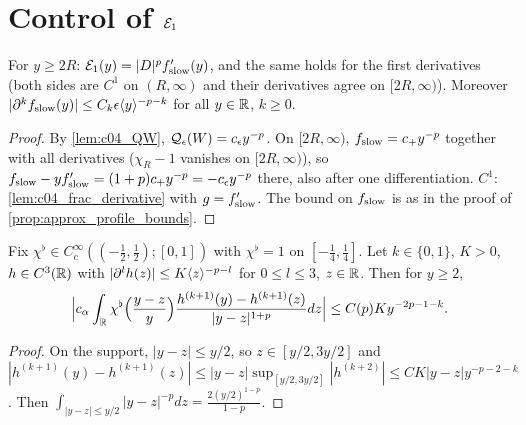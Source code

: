 \section{Control of $\mathcal{E}_1$}

\begin{lemma}
  \label{lem:c04_E1_formula}
  For $y\ge2R$: $\mathcal{E}_1(y)=|D|^pf_{\textup{slow}}'(y)$, and the same holds for the first derivatives (both sides are $C^1$ on $(R,\infty)$ and
  their derivatives agree on $[2R,\infty)$). Moreover $|\partial^kf_{\textup{slow}}(y)|\le C_k\epsilon\langle y \rangle^{-p-k}$ for all $y\in\mathbb{R}$, $k\ge0$.
\end{lemma}
\begin{proof}
  By \cref{lem:c04_QW}, $\mathcal{Q}_\epsilon(W)=c_\epsilon y^{-p}$. On $[2R,\infty)$, $f_{\textup{slow}}=c_+y^{-p}$ together with all derivatives
  ($\chi_R-1$ vanishes on $[2R,\infty)$), so $f_{\textup{slow}}-yf_{\textup{slow}}'=(1+p)c_+y^{-p}=-c_\epsilon y^{-p}$ there, also after one differentiation.
  $C^1$: \cref{lem:c04_frac_derivative} with $g=f_{\textup{slow}}'$. The bound on $f_{\textup{slow}}$ is as in the proof of \cref{prop:approx_profile_bounds}.
\end{proof}

\begin{lemma}
  \label{lem:c04_frac_decay_near}
  Fix $\chi^\flat\in C_c^\infty((-\frac12,\frac12);[0,1])$ with $\chi^\flat=1$ on $[-\frac14,\frac14]$. Let $k\in\{0,1\}$, $K>0$, $h\in C^{3}(\mathbb{R})$ with
  $|\partial^lh(z)|\le K\langle z \rangle^{-p-l}$ for $0\le l\le3$, $z\in\mathbb{R}$. Then for $y\ge2$,
  \[\Bigl|c_\alpha\int_{\mathbb{R}}\chi^\flat\Bigl(\frac{y-z}y\Bigr)\frac{h^{(k+1)}(y)-h^{(k+1)}(z)}{|y-z|^{1+p}}dz\Bigr|\le C(p)Ky^{-2p-1-k}.\]
\end{lemma}
\begin{proof}
  On the support, $|y-z|\le y/2$, so $z\in[y/2,3y/2]$ and $|h^{(k+1)}(y)-h^{(k+1)}(z)|\le|y-z|\sup_{[y/2,3y/2]}|h^{(k+2)}|\le CK|y-z|y^{-p-2-k}$.
  Then $\int_{|y-z|\le y/2}|y-z|^{-p}dz=\frac{2(y/2)^{1-p}}{1-p}$.
\end{proof}


